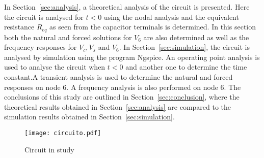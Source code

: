 In Section~\ref{sec:analysis}, a theoretical analysis of the circuit is
presented. Here the circuit is analysed for $t<0$ using the nodal analysis and the equivalent resistance $R_{eq}$ as seen from the capacitor terminals is determined. In this section both the natural and forced solutions for $V_6$ are also determined as well as the frequency responses for $V_c, V_s$ and $V_6 $. In Section~\ref{sec:simulation}, the circuit is analysed by
simulation using the program Ngspice. An operating point analysis is used to analyse the circuit when $t<0$ and another one to determine the time constant.A transient analysis is used to determine the natural and forced responses on node 6. A frequency analysis is also performed on node 6. The conclusions of this study are outlined in
Section~\ref{sec:conclusion}, where the theoretical results obtained in
Section~\ref{sec:analysis} are compared to the simulation results obtained in
Section~\ref{sec:simulation}.

\begin{figure}[h] \centering
\texttt{[image: circuito.pdf]}
\caption{Circuit in study}
\label{fig:circuit_t2}
\end{figure}


\pagebreak
